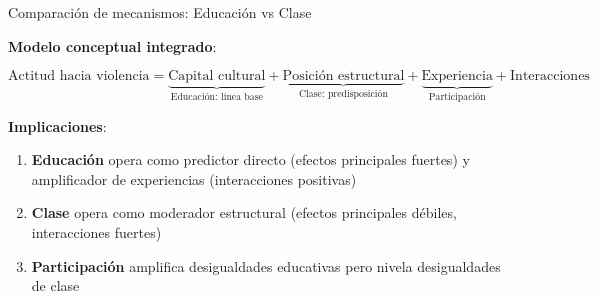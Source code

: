 \documentclass[
  12pt,
]{article}
\begin{document}
\begin{table}

\caption{\label{tbl-comparacion}Comparación de mecanismos: Educación vs
Clase}


\end{table}%

\textbf{Modelo conceptual integrado}:

\[
\text{Actitud hacia violencia} = \underbrace{\text{Capital cultural}}_{\text{Educación: línea base}} + \underbrace{\text{Posición estructural}}_{\text{Clase: predisposición}} + \underbrace{\text{Experiencia}}_{\text{Participación}} + \text{Interacciones}
\]

\textbf{Implicaciones}:

\begin{enumerate}
\def\labelenumi{\arabic{enumi}.}
\item
  \textbf{Educación} opera como predictor directo (efectos principales
  fuertes) y amplificador de experiencias (interacciones positivas)
\item
  \textbf{Clase} opera como moderador estructural (efectos principales
  débiles, interacciones fuertes)
\item
  \textbf{Participación} amplifica desigualdades educativas pero nivela
  desigualdades de clase
\end{enumerate}
\end{document}
